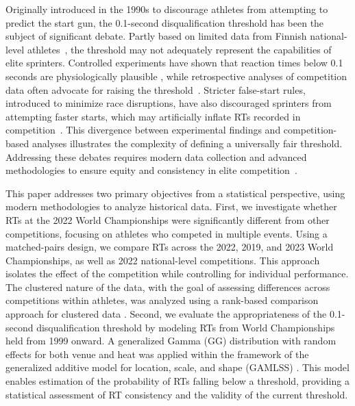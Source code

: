 \documentclass[12pt, letterpaper]{article}
\begin{document}
Originally introduced in the 1990s to discourage athletes from attempting
to predict the start gun, the 0.1-second disqualification threshold 
has been the subject of significant debate.   Partly based on limited
data from Finnish national-level athletes~\citep{mero1990reaction}, the
threshold may not adequately represent the capabilities of elite
sprinters. Controlled experiments have shown that reaction times below
0.1 seconds are physiologically plausible \citep{pain2007sprint,
  komi2009iaaf}, while retrospective analyses of competition data
often advocate for raising the threshold~\citep{brosnan2017effects,
  lipps2011implications}. Stricter false-start rules, introduced to
minimize race disruptions, have also discouraged sprinters from
attempting faster starts, which may artificially inflate RTs recorded
in competition~\citep{haugen2013effect}. This divergence between
experimental findings and competition-based analyses illustrates the
complexity of defining a universally fair threshold. Addressing these
debates requires modern data collection and advanced methodologies to
ensure equity and consistency in elite
competition~\citep{milloz2021sprint}.


This paper addresses two primary objectives from a statistical
perspective, using modern methodologies to analyze historical
data. First, we investigate whether RTs at the 2022
World Championships were significantly different from other
competitions, focusing on athletes who competed in multiple
events. Using a matched-pairs design, we compare RTs across the 2022,
2019, and 2023 World Championships, as well as 2022 national-level
competitions. This approach isolates the effect of the competition
 while controlling for individual performance. The clustered
nature of the data, with the goal of assessing differences across
competitions within athletes, was analyzed using a rank-based comparison
approach for clustered data \citep{datta2005rank}. Second, we evaluate
the appropriateness of the 0.1-second disqualification threshold by
modeling RTs from World Championships held from 1999 onward. A
generalized Gamma (GG) distribution with random effects for both venue and
heat was applied within the framework of the generalized additive
model for location, scale, and shape (GAMLSS)
\citep{rigby2005generalized, stasinopoulos2024generalized}.
This model enables estimation of the
probability of RTs falling below a threshold, providing a
statistical assessment of RT consistency and the validity of the
current threshold.
\end{document}
